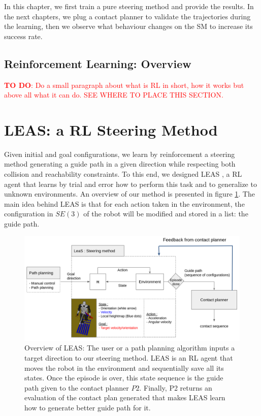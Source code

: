 In this chapter, we first train a pure steering method and provide the results. 
In the next chapters, we plug a contact planner to validate the trajectories during the learning, then we observe what behaviour changes on the SM to increase its success rate.

\subsection{Reinforcement Learning: Overview}
\textcolor{red}{\textbf{TO DO}: Do a small paragraph about what is RL in short, how it works but above all what it can do. SEE WHERE TO PLACE THIS SECTION.}


\section{LEAS: a RL Steering Method\label{subsec:leas-RL}}
Given initial and goal configurations, we learn by reinforcement a steering method generating a guide path in a given direction while respecting both collision and reachability constraints. 
To this end, we designed LEAS \cite{LEAS}, a RL agent that learns by trial and error how to perform this task and to generalize to unknown environments. An overview of our method is presented in figure \ref{fig:LEAS}. The main idea behind LEAS is that for each action taken in the environment, the configuration in $SE(3)$ of the robot will be modified and stored in a list: the guide path.

\begin{figure}
    \centering
    \includegraphics[width=\textwidth]{Figures/Chapter_LEAS/leas_overview.png}
    \caption{Overview of LEAS: The user or a path planning algorithm inputs a target direction to our steering method. LEAS is an RL agent that moves the robot in the environment and sequentially save all its states. Once the episode is over, this state sequence is the guide path given to the contact planner $P2$. Finally, P2 returns an evaluation of the contact plan generated that makes LEAS learn how to generate better guide path for it.}
    \label{fig:LEAS}
\end{figure}


